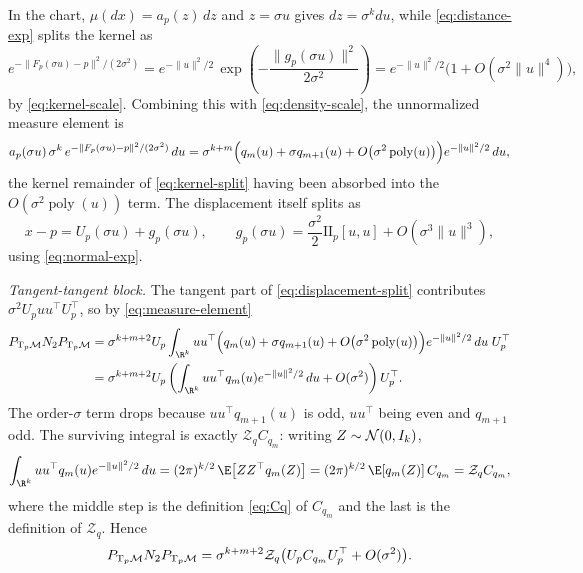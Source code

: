 In the chart, $\mu(dx)=a_p(z)\,dz$ and $z=\sigma u$ gives $dz=\sigma^k du$, while
\eqref{eq:distance-exp} splits the kernel as
\begin{equation}
  e^{-\|F_p(\sigma u)-p\|^2/(2\sigma^2)}
  =e^{-\|u\|^2/2}\,
   \exp\!\left(-\frac{\|g_p(\sigma u)\|^2}{2\sigma^2}\right)
  =e^{-\|u\|^2/2}\bigl(1+O(\sigma^2\|u\|^4)\bigr),
  \label{eq:kernel-split}
\end{equation}
by \eqref{eq:kernel-scale}.  Combining this with \eqref{eq:density-scale}, the
unnormalized measure element is
\begin{equation}
  a_p(\sigma u)\,\sigma^k\,e^{-\|F_p(\sigma u)-p\|^2/(2\sigma^2)}\,du
  =\sigma^{k+m}
   \Bigl(q_m(u)+\sigma q_{m+1}(u)+O\bigl(\sigma^2\operatorname{poly}(u)\bigr)\Bigr)
   e^{-\|u\|^2/2}\,du,
  \label{eq:measure-element}
\end{equation}
the kernel remainder of \eqref{eq:kernel-split} having been absorbed into the
$O(\sigma^2\operatorname{poly}(u))$ term.  The displacement itself splits as
\begin{equation}
  x-p=U_p(\sigma u)+g_p(\sigma u),
  \qquad
  g_p(\sigma u)=\frac{\sigma^2}{2}\mathrm{II}_p[u,u]+O(\sigma^3\|u\|^3),
  \label{eq:displacement-split}
\end{equation}
using \eqref{eq:normal-exp}.

\emph{Tangent-tangent block.}  The tangent part of \eqref{eq:displacement-split}
contributes $\sigma^2U_puu^\top U_p^\top$, so by \eqref{eq:measure-element}
\begin{align}
  P_{\T_p\M}N_2P_{\T_p\M}
  &=\sigma^{k+m+2}U_p
    \int_{\R^k}uu^\top
    \Bigl(q_m(u)+\sigma q_{m+1}(u)+O\bigl(\sigma^2\operatorname{poly}(u)\bigr)\Bigr)
    e^{-\|u\|^2/2}\,du\;U_p^\top\nonumber\\
  &=\sigma^{k+m+2}U_p
    \left(\int_{\R^k}uu^\top q_m(u)e^{-\|u\|^2/2}\,du
    +O(\sigma^2)\right)U_p^\top.
  \label{eq:tt-second}
\end{align}
The order-$\sigma$ term drops because $uu^\top q_{m+1}(u)$ is odd, $uu^\top$
being even and $q_{m+1}$ odd.  The surviving integral is exactly
$\mathcal Z_qC_{q_m}$: writing $Z\sim\mathcal{N}(0,I_k)$,
\begin{equation}
  \int_{\R^k}uu^\top q_m(u)e^{-\|u\|^2/2}\,du
  =(2\pi)^{k/2}\,\E\bigl[ZZ^\top q_m(Z)\bigr]
  =(2\pi)^{k/2}\,\E[q_m(Z)]\,C_{q_m}
  =\mathcal Z_qC_{q_m},
  \label{eq:tt-integral}
\end{equation}
where the middle step is the definition \eqref{eq:Cq} of $C_{q_m}$ and the last
is the definition of $\mathcal Z_q$.  Hence
\begin{equation}
  P_{\mathrm{T}_p\mathcal{M}}N_2P_{\mathrm{T}_p\mathcal{M}}
  =\sigma^{k+m+2}\mathcal Z_q
   \bigl(U_pC_{q_m}U_p^\top+O(\sigma^2)\bigr).
  \label{eq:tt-final}
\end{equation}

